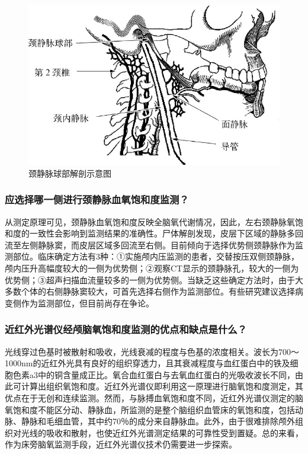\begin{figure}[!htbp]
 \centering
 \includegraphics{./images/Image00272.jpg}
 \captionsetup{justification=centering}
 \caption{颈静脉球部解剖示意图}
 \label{fig23-3}
  \end{figure} 

\subsubsection{应选择哪一侧进行颈静脉血氧饱和度监测？}

从测定原理可见，颈静脉血氧饱和度反映全脑氧代谢情况，因此，左右颈静脉氧饱和度的一致性会影响到监测结果的准确性。尸体解剖发现，皮层下区域的静脉多回流至左侧静脉窦，而皮层区域多回流至右侧。目前倾向于选择优势侧颈静脉作为监测部位。临床确定方法有3种：①实施颅内压监测的患者，交替按压双侧颈静脉，颅内压升高幅度较大的一侧为优势侧；②观察CT显示的颈静脉孔，较大的一侧为优势侧；③超声扫描血流量较多的一侧为优势侧。当缺乏这些确定方法时，由于大多数个体的右侧静脉窦较大，可首先选择右侧作为监测部位。有些研究建议选择病变侧作为监测部位，但目前尚存在争论。

\subsubsection{近红外光谱仪经颅脑氧饱和度监测的优点和缺点是什么？}

光线穿过色基时被散射和吸收，光线衰减的程度与色基的浓度相关。波长为700～1000nm的近红外光具有良好的组织穿透力，且其衰减程度与血红蛋白中的铁及细胞色素a3中的铜含量成正比。氧合血红蛋白与去氧血红蛋白的光吸收波长不同，由此可计算出组织氧饱和度。近红外光谱仪即利用这一原理进行脑氧饱和度测定，其优点在于无创和连续监测。然而，与脉搏血氧饱和度不同，近红外光谱仪测定的脑氧饱和度不能区分动、静脉血，所监测的是整个脑组织血管床的氧饱和度，包括动脉、静脉和毛细血管，其中约70％的成分来自静脉血。此外，由于很难排除颅外组织对光线的吸收和散射，也使近红外光谱测定结果的可靠性受到置疑。总的来看，作为床旁脑氧监测手段，近红外光谱仪技术仍需要进一步探索。

